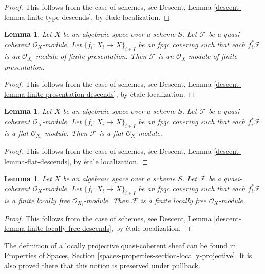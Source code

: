 \documentclass{stacks-project}
\theoremstyle{plain}
\newtheorem{lemma}[subsection]{Lemma}
\theoremstyle{definition}
\theoremstyle{remark}
\numberwithin{equation}{subsection}
\begin{document}
\begin{proof}
This follows from the case of schemes, see
Descent, Lemma \ref{descent-lemma-finite-type-descends},
by \'etale localization.
\end{proof}

\begin{lemma}
\label{lemma-finite-presentation-descends}
Let $X$ be an algebraic space over a scheme $S$.
Let $\mathcal{F}$ be a quasi-coherent $\mathcal{O}_X$-module.
Let $\{f_i : X_i \to X\}_{i \in I}$ be an fpqc covering such that
each $f_i^*\mathcal{F}$ is an $\mathcal{O}_{X_i}$-module of finite
presentation. Then $\mathcal{F}$ is an $\mathcal{O}_X$-module
of finite presentation.
\end{lemma}

\begin{proof}
This follows from the case of schemes, see
Descent, Lemma \ref{descent-lemma-finite-presentation-descends},
by \'etale localization.
\end{proof}

\begin{lemma}
\label{lemma-flat-descends}
Let $X$ be an algebraic space over a scheme $S$.
Let $\mathcal{F}$ be a quasi-coherent $\mathcal{O}_X$-module.
Let $\{f_i : X_i \to X\}_{i \in I}$ be an fpqc covering such that
each $f_i^*\mathcal{F}$ is a flat $\mathcal{O}_{X_i}$-module.
Then $\mathcal{F}$ is a flat $\mathcal{O}_X$-module.
\end{lemma}

\begin{proof}
This follows from the case of schemes, see
Descent, Lemma \ref{descent-lemma-flat-descends},
by \'etale localization.
\end{proof}

\begin{lemma}
\label{lemma-finite-locally-free-descends}
Let $X$ be an algebraic space over a scheme $S$.
Let $\mathcal{F}$ be a quasi-coherent $\mathcal{O}_X$-module.
Let $\{f_i : X_i \to X\}_{i \in I}$ be an fpqc covering such that
each $f_i^*\mathcal{F}$ is a finite locally free $\mathcal{O}_{X_i}$-module.
Then $\mathcal{F}$ is a finite locally free $\mathcal{O}_X$-module.
\end{lemma}

\begin{proof}
This follows from the case of schemes, see
Descent, Lemma \ref{descent-lemma-finite-locally-free-descends},
by \'etale localization.
\end{proof}

\noindent
The definition of a locally projective quasi-coherent sheaf can be found in
Properties of Spaces, Section
\ref{spaces-properties-section-locally-projective}.
It is also proved there that this notion is preserved under pullback.
\end{document}
